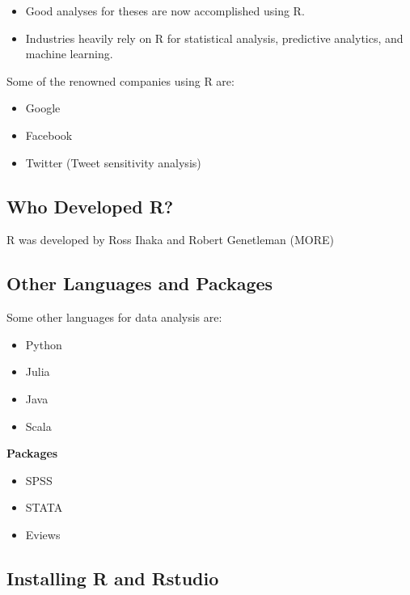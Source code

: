 \documentclass[
]{book}
\providecommand{\tightlist}{%
  \setlength{\itemsep}{0pt}\setlength{\parskip}{0pt}}
\begin{document}
\begin{itemize}
\tightlist
\item
  Good analyses for theses are now accomplished using R.
\item
  Industries heavily rely on R for statistical analysis, predictive analytics, and machine learning.
\end{itemize}

Some of the renowned companies using R are:

\begin{itemize}
\tightlist
\item
  Google
\item
  Facebook
\item
  Twitter (Tweet sensitivity analysis)
\end{itemize}

\hypertarget{who-developed-r}{%
\subsection{Who Developed R?}\label{who-developed-r}}

R was developed by Ross Ihaka and Robert Genetleman ({MORE})

\hypertarget{other-languages-and-packages}{%
\subsection{Other Languages and Packages}\label{other-languages-and-packages}}

Some other languages for data analysis are:

\begin{itemize}
\tightlist
\item
  Python
\item
  Julia
\item
  Java
\item
  Scala
\end{itemize}

\textbf{Packages}

\begin{itemize}
\tightlist
\item
  SPSS
\item
  STATA
\item
  Eviews
\end{itemize}

\hypertarget{installing-r-and-rstudio}{%
\subsection{Installing R and Rstudio}\label{installing-r-and-rstudio}}
\end{document}
